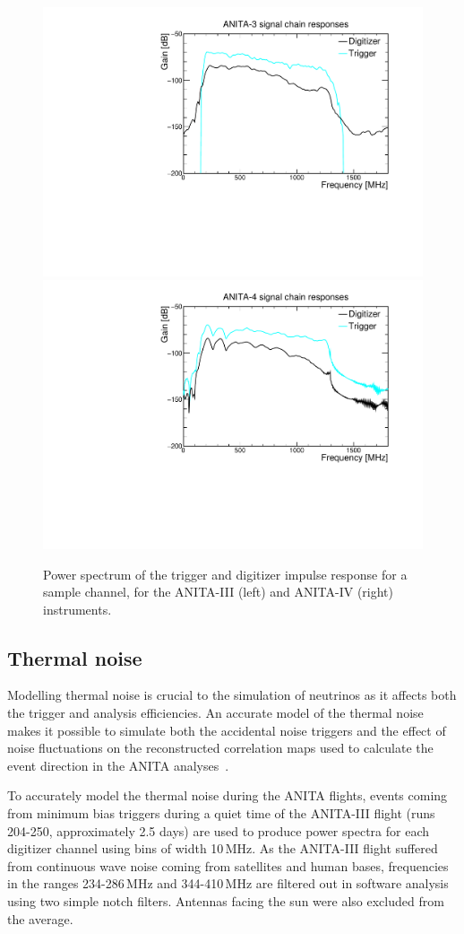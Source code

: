 \begin{figure}[!h]\centering
  \includegraphics[width=.45\linewidth]{./Figs/A3ImpulseResponses.pdf}
  \includegraphics[width=.45\linewidth]{./Figs/A4ImpulseResponses.pdf}
  \caption{Power spectrum of the trigger and digitizer impulse
    response for a sample channel, for the ANITA-III (left) and ANITA-IV (right) instruments. 
    }
  \label{fig:ANITA_ImpulseResponses}
\end{figure}





\subsection{Thermal noise}
\label{subsec:ANITA_thermalNoise}
Modelling thermal noise is crucial to the simulation of
neutrinos as it affects both the trigger and analysis efficiencies.
An accurate model of the thermal noise makes it possible to simulate both the
accidental noise triggers and the effect of noise fluctuations on the
reconstructed correlation maps used to calculate the event direction in the ANITA analyses~\cite{romero2015interferometric}.

To accurately model the thermal noise during the ANITA flights, events coming from minimum bias triggers during
a quiet time of the ANITA-III flight (runs 204-250, approximately 2.5
days) are used to produce power spectra for each digitizer channel
using bins of width 10\,MHz.
As the ANITA-III flight suffered from continuous wave noise coming
from satellites and human bases, frequencies in the ranges
234-286\,MHz and 344-410\,MHz are filtered out in software analysis
using two simple notch filters. 
Antennas facing the sun were also excluded from the average.

